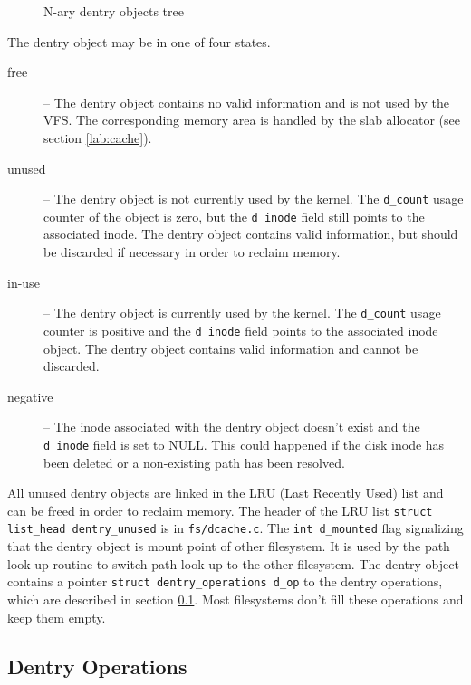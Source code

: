 \begin{figure}[hp]
	\begin{center}
		
	\end{center}
	\caption{N-ary dentry objects tree}
	\label{fig:vfs_dentry}
\end{figure}

\newpage
The dentry object may be in one of four states.
\begin{description}
	\item[free] -- The dentry object contains no valid information and is not used
		by the VFS. The corresponding memory area is handled by the slab
		allocator (see section \ref{lab:cache}).
	\item[unused] -- The dentry object is not currently used by the kernel. The
		\texttt{d\_count} usage counter of the object is zero, but the
		\texttt{d\_inode} field still points to the associated inode. The
		dentry object contains valid information, but should be discarded if
		necessary in order to reclaim memory.
	\item[in-use] -- The dentry object is currently used by the kernel. The
		\texttt{d\_count} usage counter is positive and the \texttt{d\_inode}
		field points to the associated inode object. The dentry object
		contains valid information and cannot be discarded.
	\item[negative] -- The inode associated with the dentry object doesn't exist
		and the \texttt{d\_inode} field is set to NULL. This could happened if the
		disk inode has been deleted or a non-existing path has been resolved.
\end{description}

All unused dentry objects are linked in the LRU (Last Recently Used) list and can be freed
in order to reclaim memory. The header of the LRU list \texttt{struct list\_head
dentry\_unused} is in \texttt{fs/dcache.c}. The \texttt{int d\_mounted} flag
signalizing that the dentry object is mount point of other filesystem. It is used by
the path look up routine to switch path look up to the other filesystem. The dentry object
contains a pointer \texttt{struct dentry\_operations d\_op} to the dentry operations,
which are described in section \ref{lab:dentry_ops}.
Most filesystems don't fill these operations and keep them empty.

\subsection{Dentry Operations}
\label{lab:dentry_ops}

